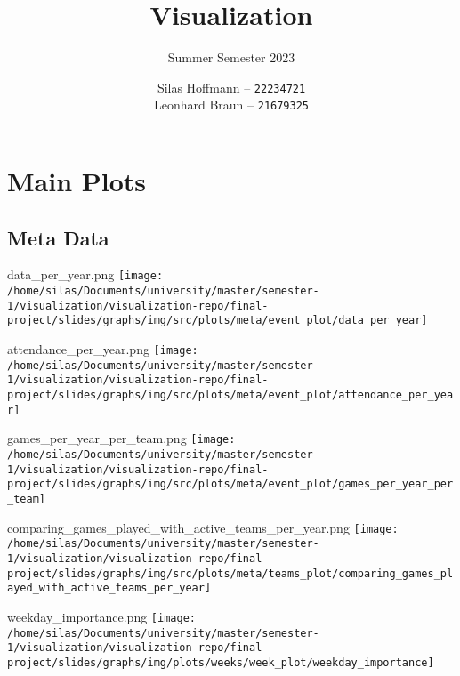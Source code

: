 \documentclass[pdf]{beamer}
\title{Visualization}
\subtitle{Summer Semester 2023}
\author{
    Silas Hoffmann --
    \texttt{22234721} \\
    Leonhard Braun --
    \texttt{21679325} \\
}
\institute{Georg-August-Universität Göttingen}
\begin{document}
\maketitle

\section{Main Plots}
\subsection{Meta Data}
\begin{frame}{data\_per\_year.png}
	\centering
	\texttt{[image: /home/silas/Documents/university/master/semester-1/visualization/visualization-repo/final-project/slides/graphs/img/src/plots/meta/event\_plot/data\_per\_year]}
\end{frame}
\begin{frame}{attendance\_per\_year.png}
	\centering
	\texttt{[image: /home/silas/Documents/university/master/semester-1/visualization/visualization-repo/final-project/slides/graphs/img/src/plots/meta/event\_plot/attendance\_per\_year]}
\end{frame}
\begin{frame}{games\_per\_year\_per\_team.png}
	\centering
	\texttt{[image: /home/silas/Documents/university/master/semester-1/visualization/visualization-repo/final-project/slides/graphs/img/src/plots/meta/event\_plot/games\_per\_year\_per\_team]}
\end{frame}
\begin{frame}{comparing\_games\_played\_with\_active\_teams\_per\_year.png}
	\centering
	\texttt{[image: /home/silas/Documents/university/master/semester-1/visualization/visualization-repo/final-project/slides/graphs/img/src/plots/meta/teams\_plot/comparing\_games\_played\_with\_active\_teams\_per\_year]}
\end{frame}
\begin{frame}{weekday\_importance.png}
	\centering
	\texttt{[image: /home/silas/Documents/university/master/semester-1/visualization/visualization-repo/final-project/slides/graphs/img/plots/weeks/week\_plot/weekday\_importance]}
\end{frame}
\end{document}
